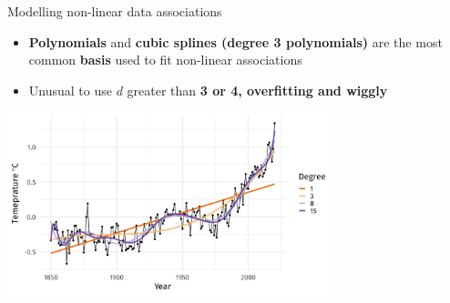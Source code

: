 \documentclass[english]{beamer}
\newcommand{\alertblue}[1]{{\color{blue}#1}}
\begin{document}
\begin{frame}{Modelling non-linear data associations}
    \begin{itemize}
        \item \alertblue{\textbf{Polynomials}} and \alertblue{\textbf{cubic splines (degree 3 polynomials)}} are the most common \alertblue{\textbf{basis}} used to fit non-linear associations 
        \item Unusual to use \(d\) greater than \alertblue{\textbf{3 or 4, overfitting and wiggly}} 
    \end{itemize}
        \centering
        \includegraphics[width=9.5cm,keepaspectratio]{images/overfit.jpg}
\end{frame}
\end{document}
